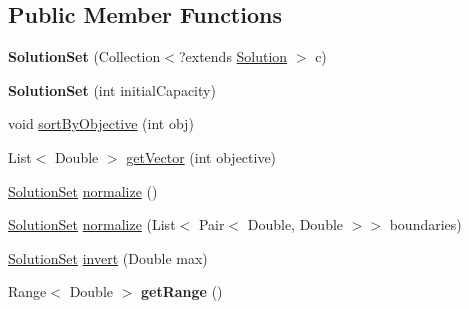 \subsection*{Public Member Functions}
\begin{DoxyCompactItemize}
\item 
\hypertarget{classcom_1_1msu_1_1moo_1_1model_1_1solution_1_1SolutionSet_a4ce11410aae86f2432abd8b1b816cde1}{{\bfseries Solution\-Set} (Collection$<$?extends \hyperlink{classcom_1_1msu_1_1moo_1_1model_1_1solution_1_1Solution}{Solution} $>$ c)}\label{classcom_1_1msu_1_1moo_1_1model_1_1solution_1_1SolutionSet_a4ce11410aae86f2432abd8b1b816cde1}

\item 
\hypertarget{classcom_1_1msu_1_1moo_1_1model_1_1solution_1_1SolutionSet_a23207a194f653eb63642111ac7594a94}{{\bfseries Solution\-Set} (int initial\-Capacity)}\label{classcom_1_1msu_1_1moo_1_1model_1_1solution_1_1SolutionSet_a23207a194f653eb63642111ac7594a94}

\item 
void \hyperlink{classcom_1_1msu_1_1moo_1_1model_1_1solution_1_1SolutionSet_aa391e68ec00d6c8baa88c0c51552d2db}{sort\-By\-Objective} (int obj)
\item 
List$<$ Double $>$ \hyperlink{classcom_1_1msu_1_1moo_1_1model_1_1solution_1_1SolutionSet_af8743102447e663dec9267f91b7b0409}{get\-Vector} (int objective)
\item 
\hyperlink{classcom_1_1msu_1_1moo_1_1model_1_1solution_1_1SolutionSet}{Solution\-Set} \hyperlink{classcom_1_1msu_1_1moo_1_1model_1_1solution_1_1SolutionSet_aebb7c5bcbf150314a27655b2947aa7c2}{normalize} ()
\item 
\hyperlink{classcom_1_1msu_1_1moo_1_1model_1_1solution_1_1SolutionSet}{Solution\-Set} \hyperlink{classcom_1_1msu_1_1moo_1_1model_1_1solution_1_1SolutionSet_ae807e94a6e92b9e61de2794d50172d08}{normalize} (List$<$ Pair$<$ Double, Double $>$$>$ boundaries)
\item 
\hyperlink{classcom_1_1msu_1_1moo_1_1model_1_1solution_1_1SolutionSet}{Solution\-Set} \hyperlink{classcom_1_1msu_1_1moo_1_1model_1_1solution_1_1SolutionSet_ae064bd3943d86dba31db36757e485f7f}{invert} (Double max)
\item 
\hypertarget{classcom_1_1msu_1_1moo_1_1model_1_1solution_1_1SolutionSet_a03afab7416e60cfe78c0e7bd04614e33}{Range$<$ Double $>$ {\bfseries get\-Range} ()}\label{classcom_1_1msu_1_1moo_1_1model_1_1solution_1_1SolutionSet_a03afab7416e60cfe78c0e7bd04614e33}

\end{DoxyCompactItemize}



